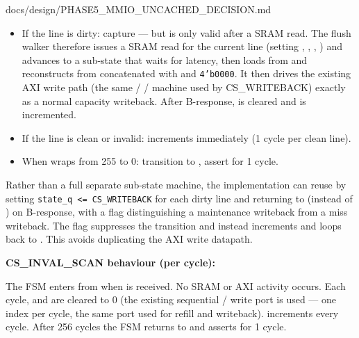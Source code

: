 \begin{relocated}{docs/design/PHASE5_MMIO_UNCACHED_DECISION.md}
\begin{itemize}
\tightlist
\item
  If the line is dirty: capture  --- but
   is only valid after a SRAM read. The flush walker
  therefore issues a SRAM read for the current line (setting
  , ,
  , ) and
  advances to a sub-state that waits for  latency,
  then loads  from  and
  reconstructs  from 
  concatenated with  and \texttt{4'b0000}. It then
  drives the existing AXI write path (the same  /
   /  machine used by
  CS\_\allowbreak{}WRITEBACK) exactly as a normal capacity writeback.
  After B-response,  is cleared and
   is incremented.
\item
  If the line is clean or invalid:  increments
  immediately (1 cycle per clean line).
\item
  When  wraps from 255 to 0: transition to
  , assert  for 1 cycle.
\end{itemize}

Rather than a full separate sub-state machine, the implementation can
reuse  by setting
\texttt{state\_\allowbreak{}q\ <=\allowbreak{}\ CS\_\allowbreak{}WRITEBACK}
for each dirty line and returning to  (instead of
) on B-response, with a  flag
distinguishing a maintenance writeback from a miss writeback. The
 flag suppresses the  transition and
instead increments  and loops back to
. This avoids duplicating the AXI write datapath.

\textbf{CS\_\allowbreak{}INVAL\_\allowbreak{}SCAN behaviour (per
cycle):}

The FSM enters  from  when
 is received. No SRAM or AXI activity occurs. Each
cycle,  and
 are cleared to 0 (the existing
sequential  /  write port is used
--- one index per cycle, the same port used for refill and writeback).
 increments every cycle. After 256 cycles the FSM
returns to  and asserts  for 1
cycle.


\end{relocated}
